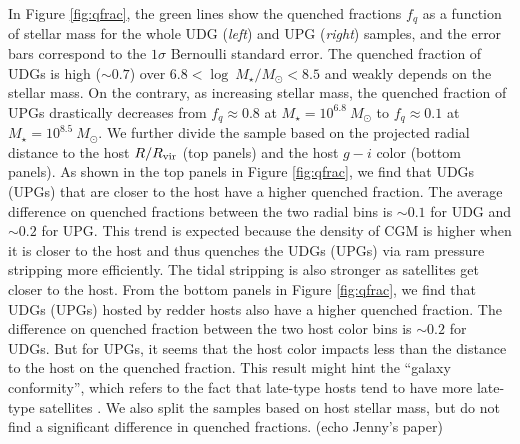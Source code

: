\documentclass[twocolumn,astrosymb,twocolappendix]{aastex631}
\begin{document}
\begin{CJK*}{UTF8}{gbsn}
In Figure \ref{fig:qfrac}, the green lines show the quenched fractions $f_q$ as a function of stellar mass for the whole UDG (\textit{left}) and UPG (\textit{right}) samples, and the error bars correspond to the $1\sigma$ Bernoulli standard error. The quenched fraction of UDGs is high ($\sim 0.7$) over $6.8 < \log\ M_\star/M_\odot < 8.5$ and weakly depends on the stellar mass. On the contrary, as increasing stellar mass, the quenched fraction of UPGs drastically decreases from $f_q \approx 0.8$ at $M_\star = 10^{6.8}\ M_\odot$ to $f_q \approx 0.1$ at $M_\star = 10^{8.5}\ M_\odot$. We further divide the sample based on the projected radial distance to the host $R/R_{\rm vir}$ (top panels) and the host $g-i$ color (bottom panels). As shown in the top panels in Figure \ref{fig:qfrac}, we find that UDGs (UPGs) that are closer to the host have a higher quenched fraction. The average difference on quenched fractions between the two radial bins is $\sim 0.1$ for UDG and $\sim 0.2$ for UPG. This trend is expected because the density of CGM is higher when it is closer to the host and thus quenches the UDGs (UPGs) via ram pressure stripping more efficiently. The tidal stripping is also stronger as satellites get closer to the host. From the bottom panels in Figure \ref{fig:qfrac}, we find that UDGs (UPGs) hosted by redder hosts also have a higher quenched fraction. The difference on quenched fraction between the two host color bins is $\sim 0.2$ for UDGs. But for UPGs, it seems that the host color impacts less than the distance to the host on the quenched fraction. This result might hint the ``galaxy conformity'', which refers to the fact that late-type hosts tend to have more late-type satellites \citep{Weinmann2006}. We also split the samples based on host stellar mass, but do not find a significant difference in quenched fractions. (echo Jenny's paper)


\end{CJK*}
\end{document}
